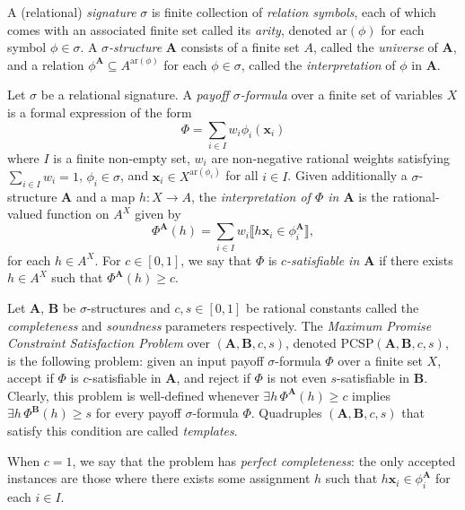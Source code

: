 \documentclass[a4paper,11pt]{article}
\theoremstyle{definition}
\newcommand{\tuple}[1]{{\mathbf{#1}}}
\newcommand{\bx}{\mathbf{x}}
\newcommand{\bfa}{\mathbf{A}}
\newcommand{\bfb}{\mathbf{B}}
\newcommand{\abcs}{(\bfa,\bfb,c,s)}
\newcommand{\pcsp}{\mathrm{PCSP}}
\newcommand{\sig}{\sigma}
\newcommand{\ar}{\mathrm{ar}}
\begin{document}
A (relational) \emph{signature} $\sigma$ is finite collection of \emph{relation symbols}, each of which comes with an associated finite set called its \emph{arity}, denoted $\ar(\phi)$ for each symbol $\phi \in \sigma$.
%
A $\sigma$\emph{-structure} $\bfa$ consists of a finite set $A$, called the \emph{universe} of $\bfa$, and a relation $\phi^\bfa \subseteq A^{\ar(\phi)}$ for each $\phi \in \sigma$, called the \emph{interpretation} of $\phi$ in $\bfa$.

Let $\sigma$ be a relational signature. A \emph{payoff $\sigma$-formula} over a
finite set of variables $X$ is a formal expression of the form 
\[\Phi = \sum_{i
\in I} w_i \phi_i(\tuple{x}_i)\]
where $I$ is a finite non-empty set, $w_i$ are non-negative rational weights satisfying $\sum_{i\in I}w_i=1$, $\phi_i \in \sig$, and $\tuple{x}_i \in X^{\ar(\phi_i)}$ for all $i \in I$.
    Given additionally a $\sigma$-structure $\bfa$ and a map $h:X\to A$, the \emph{interpretation of $\Phi$ in $\bfa$} is the rational-valued function on $A^X$ given by 
   \[ 
    \Phi^{\bfa}(h) = \sum_{i \in I} w_i \llbracket h\tuple{x}_i \in \phi_i^{\bfa}\rrbracket,
   \] 
    for each $h \in A^X$.
    For $c \in [0,1]$, we say that $\Phi$ is \emph{$c$-satisfiable in $\bfa$} if there exists $h \in A^X$ such that $\Phi^\bfa(h) \geq c$.

Let $\bfa$, $\bfb$ be $\sigma$-structures and $c,s \in [0,1]$ be rational constants called the \emph{completeness} and \emph{soundness} parameters respectively. The \emph{Maximum Promise Constraint Satisfaction Problem} over $(\bfa,\bfb,c,s)$, denoted $\pcsp\abcs$, is the following problem: given an input payoff $\sigma$-formula $\Phi$ over a finite set $X$, accept if $\Phi$ is $c$-satisfiable in $\bfa$, and reject if $\Phi$ is not even $s$-satisfiable in $\bfb$. Clearly, this problem is well-defined whenever $\exists h \, \Phi^{\bfa}(h) \geq c$ implies $\exists h \, \Phi^{\bfb}(h) \geq s$ for every payoff $\sigma$-formula $\Phi$. Quadruples $\abcs$ that satisfy this condition are called \emph{templates}.

When $c=1$, we say that the problem has \emph{perfect completeness}: the only accepted instances are those where there exists some assignment $h$ such that $h\bx_i \in \phi_i^\bfa$ for each $i \in I$.
\end{document}
